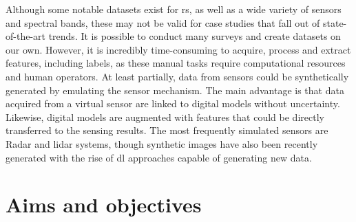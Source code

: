 Although some notable datasets exist for \acrshort{rs}, as well as a wide variety of sensors and spectral bands, these may not be valid for case studies that fall out of state-of-the-art trends. It is possible to conduct many surveys and create datasets on our own. However, it is incredibly time-consuming to acquire, process and extract features, including labels, as these manual tasks require computational resources and human operators. At least partially, data from sensors could be synthetically generated by emulating the sensor mechanism. The main advantage is that data acquired from a virtual sensor are linked to digital models without uncertainty. Likewise, digital models are augmented with features that could be directly transferred to the sensing results. The most frequently simulated sensors are Radar and \acrshort{lidar} systems, though synthetic images have also been recently generated with the rise of \acrshort{dl} approaches capable of generating new data.  

\section{Aims and objectives}

